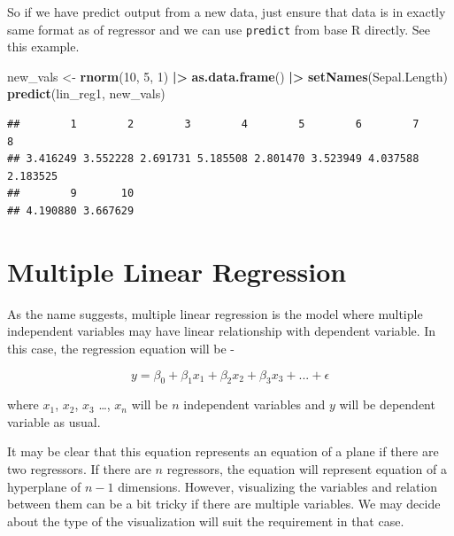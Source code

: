 \documentclass[
]{book}
\newenvironment{Shaded}{\begin{snugshade}}{\end{snugshade}}
\newcommand{\DecValTok}[1]{\textcolor[rgb]{0.00,0.00,0.81}{#1}}
\newcommand{\FunctionTok}[1]{\textcolor[rgb]{0.13,0.29,0.53}{\textbf{#1}}}
\newcommand{\NormalTok}[1]{#1}
\newcommand{\OtherTok}[1]{\textcolor[rgb]{0.56,0.35,0.01}{#1}}
\newcommand{\SpecialCharTok}[1]{\textcolor[rgb]{0.81,0.36,0.00}{\textbf{#1}}}
\newcommand{\StringTok}[1]{\textcolor[rgb]{0.31,0.60,0.02}{#1}}
\begin{document}
So if we have predict output from a new data, just ensure that data is in exactly same format as of regressor and we can use \texttt{predict} from base R directly. See this example.

\begin{Shaded}
\begin{Highlighting}[]
\NormalTok{new\_vals }\OtherTok{\textless{}{-}} \FunctionTok{rnorm}\NormalTok{(}\DecValTok{10}\NormalTok{, }\DecValTok{5}\NormalTok{, }\DecValTok{1}\NormalTok{) }\SpecialCharTok{|\textgreater{}} 
  \FunctionTok{as.data.frame}\NormalTok{() }\SpecialCharTok{|\textgreater{}}
  \FunctionTok{setNames}\NormalTok{(}\StringTok{\textquotesingle{}Sepal.Length\textquotesingle{}}\NormalTok{)}
\FunctionTok{predict}\NormalTok{(lin\_reg1, new\_vals)}
\end{Highlighting}
\end{Shaded}

\begin{verbatim}
##        1        2        3        4        5        6        7        8 
## 3.416249 3.552228 2.691731 5.185508 2.801470 3.523949 4.037588 2.183525 
##        9       10 
## 4.190880 3.667629
\end{verbatim}

\hypertarget{multiple-linear-regression}{%
\section{Multiple Linear Regression}\label{multiple-linear-regression}}

As the name suggests, multiple linear regression is the model where multiple independent variables may have linear relationship with dependent variable. In this case, the regression equation will be -

\begin{equation} 
y = \beta_0 + \beta_1x_1 + \beta_2x_2 + \beta_3x_3 + ... + \epsilon
\label{eq:lr12}
\end{equation}

where \(x_1\), \(x_2\), \(x_3\) \ldots, \(x_n\) will be \(n\) independent variables and \(y\) will be dependent variable as usual.

It may be clear that this equation represents an equation of a plane if there are two regressors. If there are \(n\) regressors, the equation will represent equation of a hyperplane of \(n-1\) dimensions. However, visualizing the variables and relation between them can be a bit tricky if there are multiple variables. We may decide about the type of the visualization will suit the requirement in that case.
\end{document}
